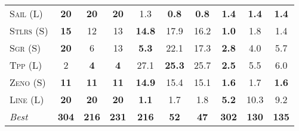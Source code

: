 \documentclass[11pt]{article}
\begin{document}
\begin{table*}[tb]
{\begin{tabular}{|l||ccc||ccc||ccc||}
\textsc{Sail} (L)&\textbf{20}&\textbf{20}&\textbf{20}&1.3&\textbf{0.8}&\textbf{0.8}&\textbf{1.4}&\textbf{1.4}&\textbf{1.4}\\
\textsc{Stlrs} (S)&\textbf{15}&12&13&\textbf{14.8}&17.9&16.2&\textbf{1.0}&1.8&1.4\\
\textsc{Sgr} (S)&\textbf{20}&6&13&\textbf{5.3}&22.1&17.3&\textbf{2.8}&4.0&5.7\\
\textsc{Tpp} (L)&2&\textbf{4}&\textbf{4}&27.1&\textbf{25.3}&25.7&\textbf{2.5}&5.5&6.0\\
\textsc{Zeno} (S)&\textbf{11}&\textbf{11}&\textbf{11}&\textbf{14.9}&15.4&15.1&\textbf{1.6}&1.7&\textbf{1.6}\\
\textsc{Line} (L)&\textbf{20}&\textbf{20}&\textbf{20}&\textbf{1.1}&1.7&1.8&\textbf{5.2}&10.3&9.2
\\\hline
\textit{Best}&\textbf{304}&\textbf{216}&\textbf{231}&\textbf{216}&\textbf{52}&\textbf{47}&\textbf{302}&\textbf{130}&\textbf{135}\\\hline

        \end{tabular}}
        \caption{}
        \label{tab:all-patty}
        \end{table*}
        
\end{document}
